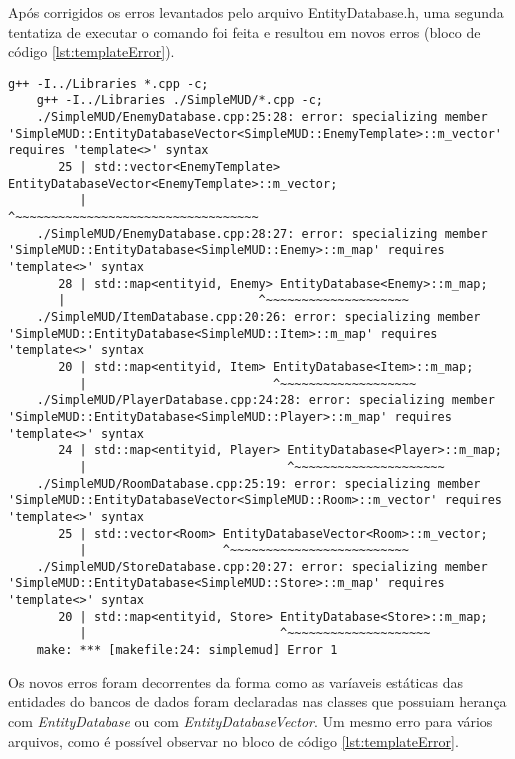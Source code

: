 Após corrigidos os erros levantados pelo arquivo EntityDatabase.h, uma segunda tentatiza de 
executar o comando foi feita e resultou em novos erros (bloco de código \ref{lst:templateError}).

\begin{lstlisting}[breaklines, label={lst:templateError}, caption={Erros da sintaxe de template}]
    g++ -I../Libraries *.cpp -c;
    g++ -I../Libraries ./SimpleMUD/*.cpp -c;
    ./SimpleMUD/EnemyDatabase.cpp:25:28: error: specializing member 'SimpleMUD::EntityDatabaseVector<SimpleMUD::EnemyTemplate>::m_vector' requires 'template<>' syntax
       25 | std::vector<EnemyTemplate> EntityDatabaseVector<EnemyTemplate>::m_vector;
          |                            ^~~~~~~~~~~~~~~~~~~~~~~~~~~~~~~~~~~
    ./SimpleMUD/EnemyDatabase.cpp:28:27: error: specializing member 'SimpleMUD::EntityDatabase<SimpleMUD::Enemy>::m_map' requires 'template<>' syntax
       28 | std::map<entityid, Enemy> EntityDatabase<Enemy>::m_map;
       |                           ^~~~~~~~~~~~~~~~~~~~~
    ./SimpleMUD/ItemDatabase.cpp:20:26: error: specializing member 'SimpleMUD::EntityDatabase<SimpleMUD::Item>::m_map' requires 'template<>' syntax
       20 | std::map<entityid, Item> EntityDatabase<Item>::m_map;
          |                          ^~~~~~~~~~~~~~~~~~~~
    ./SimpleMUD/PlayerDatabase.cpp:24:28: error: specializing member 'SimpleMUD::EntityDatabase<SimpleMUD::Player>::m_map' requires 'template<>' syntax
       24 | std::map<entityid, Player> EntityDatabase<Player>::m_map;
          |                            ^~~~~~~~~~~~~~~~~~~~~~
    ./SimpleMUD/RoomDatabase.cpp:25:19: error: specializing member 'SimpleMUD::EntityDatabaseVector<SimpleMUD::Room>::m_vector' requires 'template<>' syntax
       25 | std::vector<Room> EntityDatabaseVector<Room>::m_vector;
          |                   ^~~~~~~~~~~~~~~~~~~~~~~~~~
    ./SimpleMUD/StoreDatabase.cpp:20:27: error: specializing member 'SimpleMUD::EntityDatabase<SimpleMUD::Store>::m_map' requires 'template<>' syntax
       20 | std::map<entityid, Store> EntityDatabase<Store>::m_map;
          |                           ^~~~~~~~~~~~~~~~~~~~~
    make: *** [makefile:24: simplemud] Error 1
\end{lstlisting}

Os novos erros foram decorrentes da forma como as varíaveis estáticas das entidades do bancos de dados
foram declaradas nas classes que possuiam herança com \textit{EntityDatabase} ou com \textit{EntityDatabaseVector}. 
Um mesmo erro para vários arquivos, como é possível observar no bloco de código \ref{lst:templateError}. 

